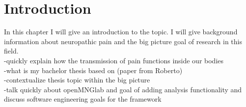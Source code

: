 \chapter{Introduction}
In this chapter I will give an introduction to the topic. I will give background information about neuropathic pain and the big picture goal of research in this field. \\
-quickly explain how the transmission of pain functions inside our bodies\\
-what is my bachelor thesis based on (paper from Roberto)\\
-contextualize thesis topic within the big picture \\
-talk quickly about openMNGlab and goal of adding analysis functionality and discuss software engineering goals for the framework\\


